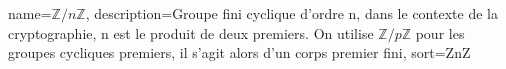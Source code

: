 {
  name={\ensuremath{\mathbb{Z}/n\mathbb{Z}}},
  description={Groupe fini cyclique d'ordre n, dans le contexte de la cryptographie, n est le produit de deux premiers. On utilise $\mathbb{Z}/p\mathbb{Z}$ pour les groupes cycliques premiers, il s'agit alors d'un corps premier fini},
  sort=ZnZ
}



\glsresetall
\makeglossaries